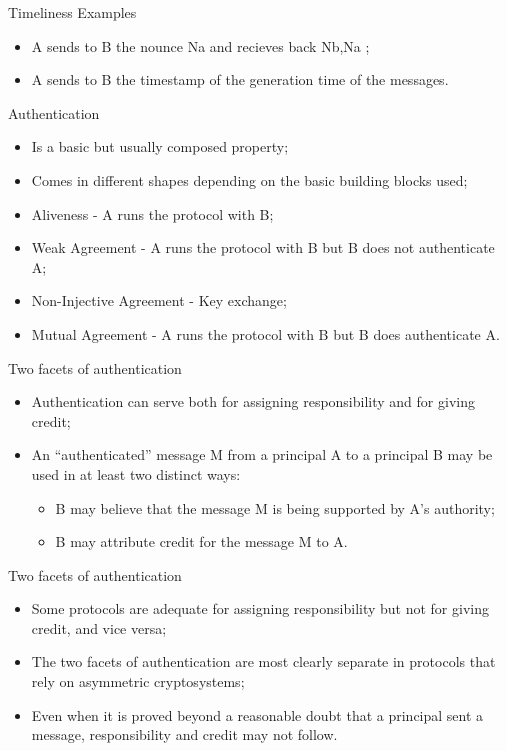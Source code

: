 \documentclass[12pt,table,xcolor={dvipsnames}]{beamer}
\begin{document}
\begin{frame}{Timeliness Examples}
\begin{itemize}
\item A sends to B the nounce Na and recieves back Nb,Na ;\pause
\item A sends to B the timestamp of the generation time of the messages.
\end{itemize}
\end{frame}

\begin{frame}{Authentication}
\begin{itemize}
\item Is a basic but usually composed property;\pause
\item Comes in different shapes depending on the basic building blocks used;\pause
\item Aliveness - A runs the protocol with B;\pause
\item Weak Agreement - A runs the protocol with B but B does not authenticate A;\pause
\item Non-Injective Agreement - Key exchange;\pause
\item Mutual Agreement - A runs the protocol with B but B does authenticate A.
\end{itemize}
\end{frame}

\begin{frame}{Two facets of authentication}
\begin{itemize}
\item Authentication can serve both for assigning responsibility and for giving credit;\pause
\item An ``authenticated'' message M from a principal A to a principal B may be used in at least two distinct ways:\pause
\begin{itemize}
\item B may believe that the message M is being supported by A’s authority;\pause
\item B may attribute credit for the message M to A.\pause
\end{itemize}
\end{itemize}
\end{frame}


\begin{frame}{Two facets of authentication}
\begin{itemize}
\item Some protocols are adequate for assigning responsibility but not for giving credit, and vice versa;\pause
\item The two facets of authentication are most clearly separate in protocols
that rely on asymmetric cryptosystems;\pause
\item Even when it is proved beyond a reasonable doubt that a principal sent a message, responsibility and credit may not follow.
\end{itemize}
\end{frame}
\end{document}
